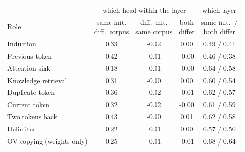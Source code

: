 \begin{tabular}{lcccc}
\toprule
& \multicolumn{3}{c}{which head within the layer} & which layer \\
\cmidrule(lr){2-4}\cmidrule(lr){5-5}
Role & \makecell{same init.\\diff.\ corpus} & \makecell{diff.\ init.\\same corpus} & \makecell{both\\differ} & \makecell{same init.\ /\\both differ} \\
\midrule
Induction & 0.33 & -0.02 & 0.00 & 0.49 / 0.41 \\
Previous token & 0.42 & -0.01 & -0.00 & 0.46 / 0.38 \\
Attention sink & 0.18 & -0.01 & -0.00 & 0.64 / 0.58 \\
Knowledge retrieval & 0.31 & -0.00 & 0.00 & 0.60 / 0.54 \\
Duplicate token & 0.36 & -0.02 & -0.01 & 0.62 / 0.57 \\
Current token & 0.32 & -0.02 & -0.00 & 0.61 / 0.59 \\
Two tokens back & 0.43 & -0.00 & 0.01 & 0.62 / 0.58 \\
Delimiter & 0.22 & -0.01 & 0.00 & 0.57 / 0.50 \\
OV copying (weights only) & 0.25 & -0.01 & -0.01 & 0.68 / 0.64 \\
\bottomrule
\end{tabular}
